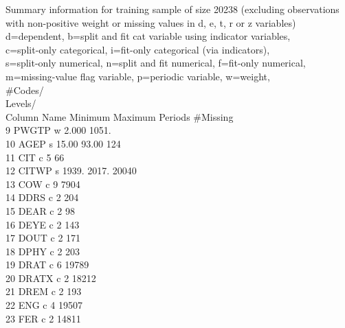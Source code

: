 \documentclass[12pt]{article}
\begin{document}
 Summary information for training sample of size 20238 (excluding observations\\
 with non-positive weight or missing values in d, e, t, r or z variables)\\
 d=dependent, b=split and fit cat variable using indicator variables,\\
 c=split-only categorical, i=fit-only categorical (via indicators),\\
 s=split-only numerical, n=split and fit numerical, f=fit-only numerical,\\
 m=missing-value flag variable, p=periodic variable, w=weight,\\
                                                  \#Codes/           \\
                                                  Levels/           \\
  Column  Name            Minimum      Maximum    Periods   \#Missing\\
       9  PWGTP      w    2.000        1051.    \\
      10  AGEP       s    15.00        93.00                    124\\
      11  CIT        c                                  5        66\\
      12  CITWP      s    1939.        2017.                  20040\\
      13  COW        c                                  9      7904\\
      14  DDRS       c                                  2       204\\
      15  DEAR       c                                  2        98\\
      16  DEYE       c                                  2       143\\
      17  DOUT       c                                  2       171\\
      18  DPHY       c                                  2       203\\
      19  DRAT       c                                  6     19789\\
      20  DRATX      c                                  2     18212\\
      21  DREM       c                                  2       193\\
      22  ENG        c                                  4     19507\\
      23  FER        c                                  2     14811\\
\end{document}
